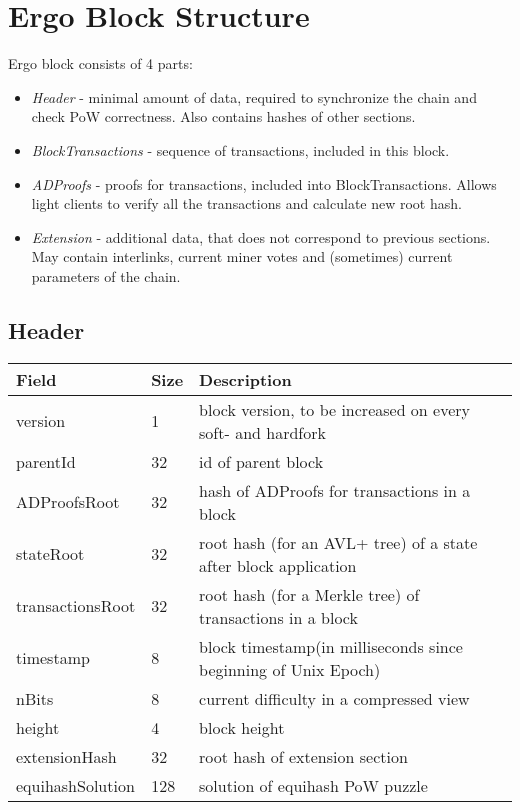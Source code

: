 \section{Ergo Block Structure}
Ergo block consists of 4 parts:

\begin{itemize}
    \item{\em Header } - minimal amount of data, required to synchronize the chain and check PoW correctness.
    Also contains hashes of other sections.
    \item{\em BlockTransactions } - sequence of transactions, included in this block.
    \item{\em ADProofs } - proofs for transactions, included into BlockTransactions.
    Allows light clients to verify all the transactions and calculate new root hash.
    \item{\em Extension } - additional data, that does not correspond to previous sections.
          May contain interlinks, current miner votes and (sometimes) current parameters of the chain.
\end{itemize}

\subsection{Header}
\vspace{1em}
\begin{tabular}{ |p{2.5cm}||p{0.5cm}|p{7.5cm}|  }
    \hline
    \hline
    Field & Size & Description  \\
    \hline
    version  &  1 &  block version, to be increased on every soft- and hardfork  \\
    \hline
    parentId &  32 &  id of parent block  \\
    \hline
    ADProofsRoot &  32 &  hash of ADProofs for transactions in a block \\
    \hline
    stateRoot &  32 &  root hash (for an AVL+ tree) of a state after block application  \\
    \hline
    transactionsRoot  &  32 &  root hash (for a Merkle tree) of transactions in a block  \\
    \hline
    timestamp &  8 &  block timestamp(in milliseconds since beginning of Unix Epoch)  \\
    \hline
    nBits &  8 & current difficulty in a compressed view  \\
    \hline
    height &  4 & block height  \\
    \hline
    extensionHash & 32 & root hash of extension section  \\
    \hline
    equihashSolution & 128 & solution of equihash PoW puzzle  \\
    \hline
\end{tabular}

